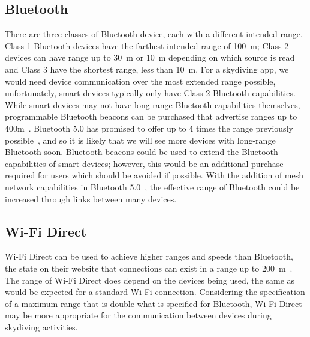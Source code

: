 \documentclass[11pt, a4paper, twocolumn]{article}
\begin{document}
\subsection{Bluetooth}\label{sec:bluetooth} %

There are three classes of Bluetooth device, each with a different intended range. Class 1 Bluetooth devices have the farthest intended range of \SI{100}{\metre}; Class 2 devices can have range up to \SI{30}{\metre} or \SI{10}{\metre} depending on which source is read~\cite{_bluetooth_????, wright_dispelling_????} and Class 3 have the shortest range, less than \SI{10}{\metre}.
For a skydiving app, we would need device communication over the most extended range possible, unfortunately, smart devices typically only have Class 2 Bluetooth capabilities. While smart devices may not have long-range Bluetooth capabilities themselves, programmable Bluetooth beacons can be purchased that advertise ranges up to 400m~\cite{_coin_????}. Bluetooth 5.0 has promised to offer up to 4 times the range previously possible~\cite{bluetooth_sig_inc_rethinking_????}, and so it is likely that we will see more devices with long-range Bluetooth soon. Bluetooth beacons could be used to extend the Bluetooth capabilities of smart devices; however, this would be an additional purchase required for users which should be avoided if possible. With the addition of mesh network capabilities in Bluetooth 5.0~\cite{_mesh_????}, the effective range of Bluetooth could be increased through links between many devices.

\subsection{Wi-Fi Direct}\label{sec:wifi-direct} %

Wi-Fi Direct can be used to achieve higher ranges and speeds than Bluetooth, the \citeauthor{wi-fi_alliance_wi-fi_????} state on their website that connections can exist in a range up to \SI{200}{\metre}~\cite{wi-fi_alliance_wi-fi_????}. The range of Wi-Fi Direct does depend on the devices being used, the same as would be expected for a standard Wi-Fi connection. Considering the specification of a maximum range that is double what is specified for Bluetooth, Wi-Fi Direct may be more appropriate for the communication between devices during skydiving activities.
\end{document}
